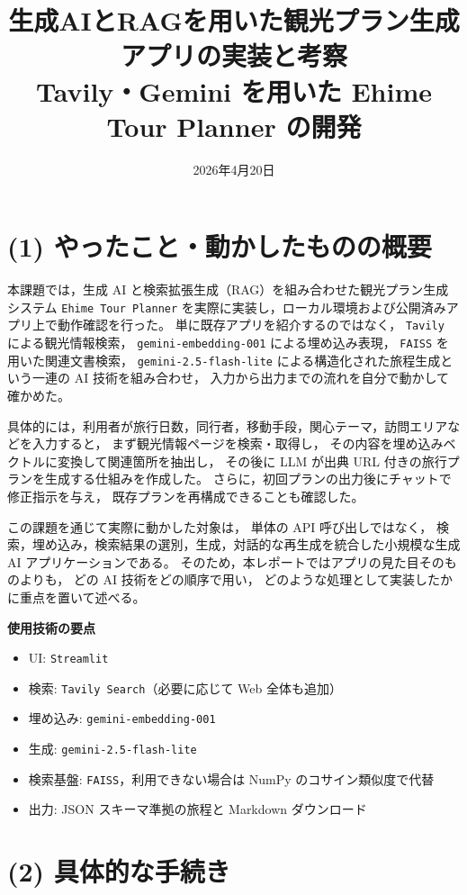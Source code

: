\documentclass[a4paper,11pt]{ltjsarticle}
\title{生成AIとRAGを用いた観光プラン生成アプリの実装と考察\\\large Tavily・Gemini を用いた Ehime Tour Planner の開発}
\author{}
\date{2026年4月20日}
\begin{document}
\maketitle

\section*{(1) やったこと・動かしたものの概要}
本課題では，生成 AI と検索拡張生成（RAG）を組み合わせた観光プラン生成システム
\texttt{Ehime Tour Planner} を実際に実装し，ローカル環境および公開済みアプリ上で動作確認を行った。
単に既存アプリを紹介するのではなく，
\texttt{Tavily} による観光情報検索，
\texttt{gemini-embedding-001} による埋め込み表現，
\texttt{FAISS} を用いた関連文書検索，
\texttt{gemini-2.5-flash-lite} による構造化された旅程生成という一連の AI 技術を組み合わせ，
入力から出力までの流れを自分で動かして確かめた。

具体的には，利用者が旅行日数，同行者，移動手段，関心テーマ，訪問エリアなどを入力すると，
まず観光情報ページを検索・取得し，
その内容を埋め込みベクトルに変換して関連箇所を抽出し，
その後に LLM が出典 URL 付きの旅行プランを生成する仕組みを作成した。
さらに，初回プランの出力後にチャットで修正指示を与え，
既存プランを再構成できることも確認した。

この課題を通じて実際に動かした対象は，
単体の API 呼び出しではなく，
検索，埋め込み，検索結果の選別，生成，対話的な再生成を統合した小規模な生成 AI アプリケーションである。
そのため，本レポートではアプリの見た目そのものよりも，
どの AI 技術をどの順序で用い，
どのような処理として実装したかに重点を置いて述べる。

\noindent\textbf{使用技術の要点}
\begin{itemize}
\item UI: \texttt{Streamlit}
\item 検索: \texttt{Tavily Search}（必要に応じて Web 全体も追加）
\item 埋め込み: \texttt{gemini-embedding-001}
\item 生成: \texttt{gemini-2.5-flash-lite}
\item 検索基盤: \texttt{FAISS}，利用できない場合は NumPy のコサイン類似度で代替
\item 出力: JSON スキーマ準拠の旅程と Markdown ダウンロード
\end{itemize}

\section*{(2) 具体的な手続き}
\end{document}
